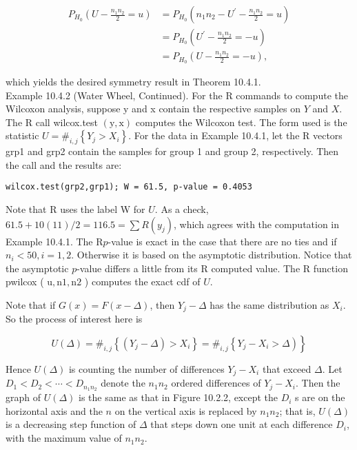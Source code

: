 $$
\begin{aligned}
P_{H_{0}}\left(U-\frac{n_{1} n_{2}}{2}=u\right) & =P_{H_{0}}\left(n_{1} n_{2}-U^{\prime}-\frac{n_{1} n_{2}}{2}=u\right) \\
& =P_{H_{0}}\left(U^{\prime}-\frac{n_{1} n_{2}}{2}=-u\right) \\
& =P_{H_{0}}\left(U-\frac{n_{1} n_{2}}{2}=-u\right),
\end{aligned}
$$

which yields the desired symmetry result in Theorem 10.4.1.\\
Example 10.4.2 (Water Wheel, Continued). For the R commands to compute the Wilcoxon analysis, suppose y and x contain the respective samples on $Y$ and $X$. The R call wilcox.test $(\mathrm{y}, \mathrm{x})$ computes the Wilcoxon test. The form used is the statistic $U=\#_{i, j}\left\{Y_{j}>X_{i}\right\}$. For the data in Example 10.4.1, let the R vectors grp1 and grp2 contain the samples for group 1 and group 2, respectively. Then the call and the results are:

\begin{verbatim}
wilcox.test(grp2,grp1); W = 61.5, p-value = 0.4053
\end{verbatim}

Note that R uses the label W for $U$. As a check, $61.5+10(11) / 2=116.5=\sum R\left(y_{j}\right)$, which agrees with the computation in Example 10.4.1. The $\mathrm{R} p$-value is exact in the case that there are no ties and if $n_{i}<50, i=1,2$. Otherwise it is based on the asymptotic distribution. Notice that the asymptotic $p$-value differs a little from its R computed value. The R function pwilcox ( $\mathrm{u}, \mathrm{n} 1, \mathrm{n} 2$ ) computes the exact cdf of $U$.

Note that if $G(x)=F(x-\Delta)$, then $Y_{j}-\Delta$ has the same distribution as $X_{i}$. So the process of interest here is


\begin{equation*}
\left.U(\Delta)=\#_{i, j}\left\{\left(Y_{j}-\Delta\right)>X_{i}\right\}=\#_{i, j}\left\{Y_{j}-X_{i}>\Delta\right)\right\} \tag{10.4.13}
\end{equation*}


Hence $U(\Delta)$ is counting the number of differences $Y_{j}-X_{i}$ that exceed $\Delta$. Let $D_{1}<D_{2}<\cdots<D_{n_{1} n_{2}}$ denote the $n_{1} n_{2}$ ordered differences of $Y_{j}-X_{i}$. Then the graph of $U(\Delta)$ is the same as that in Figure 10.2.2, except the $D_{i}$ s are on the\\
horizontal axis and the $n$ on the vertical axis is replaced by $n_{1} n_{2}$; that is, $U(\Delta)$ is a decreasing step function of $\Delta$ that steps down one unit at each difference $D_{i}$, with the maximum value of $n_{1} n_{2}$.

